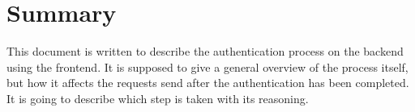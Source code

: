 \section*{Summary} %

\label{Summary} %


\newcommand{\keyword}[1]{\textbf{#1}}
\newcommand{\tabhead}[1]{\textbf{#1}}
\newcommand{\code}[1]{\texttt{#1}}
\newcommand{\file}[1]{\texttt{\bfseries#1}}
\newcommand{\option}[1]{\texttt{\itshape#1}}


This document is written to describe the authentication process on the backend using the frontend. It is supposed to give a general overview of the process itself, but how it affects the requests send after the authentication has been completed. It is going to describe which step is taken with its reasoning.